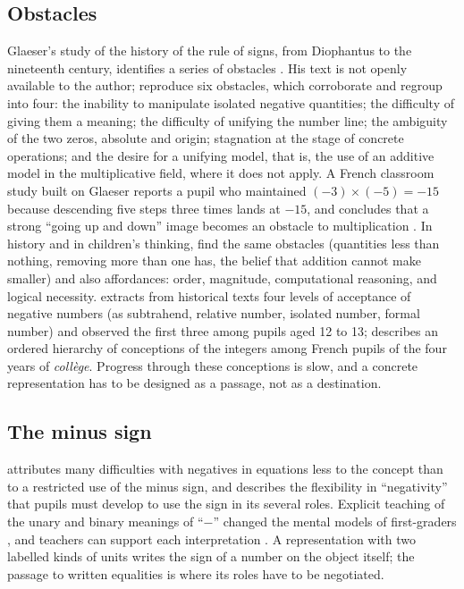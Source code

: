 \documentclass[11pt,a4paper]{article}
\theoremstyle{definition}
\begin{document}
\subsection{Obstacles}
Glaeser's study of the history of the rule of signs, from Diophantus to the nineteenth century, identifies a series of obstacles \citep{Glaeser1981}. His text is not openly available to the author; \citet{SalvadorNacarato2003} reproduce six obstacles, which \citet{Bishop2014} corroborate and \citet{IREMAquitaine2008} regroup into four: the inability to manipulate isolated negative quantities; the difficulty of giving them a meaning; the difficulty of unifying the number line; the ambiguity of the two zeros, absolute and origin; stagnation at the stage of concrete operations; and the desire for a unifying model, that is, the use of an additive model in the multiplicative field, where it does not apply. A French classroom study built on Glaeser reports a pupil who maintained $(-3)\times(-5)=-15$ because descending five steps three times lands at $-15$, and concludes that a strong ``going up and down'' image becomes an obstacle to multiplication \citep{IREMAquitaine2008}. In history and in children's thinking, \citet{Bishop2014} find the same obstacles (quantities less than nothing, removing more than one has, the belief that addition cannot make smaller) and also affordances: order, magnitude, computational reasoning, and logical necessity. \citet{Gallardo2002} extracts from historical texts four levels of acceptance of negative numbers (as subtrahend, relative number, isolated number, formal number) and observed the first three among pupils aged 12 to 13; \citet{CoquinViennot1985} describes an ordered hierarchy of conceptions of the integers among French pupils of the four years of \emph{coll\`ege}. Progress through these conceptions is slow, and a concrete representation has to be designed as a passage, not as a destination.

\subsection{The minus sign}
\citet{Vlassis2008} attributes many difficulties with negatives in equations less to the concept than to a restricted use of the minus sign, and \citet{Vlassis2004} describes the flexibility in ``negativity'' that pupils must develop to use the sign in its several roles. Explicit teaching of the unary and binary meanings of ``$-$'' changed the mental models of first-graders \citep{Bofferding2014}, and teachers can support each interpretation \citep{Lamb2012}. A representation with two labelled kinds of units writes the sign of a number on the object itself; the passage to written equalities is where its roles have to be negotiated.
\end{document}
